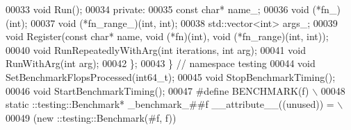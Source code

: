 \begin{DoxyCode}
00033   \textcolor{keywordtype}{void} Run();
00034  \textcolor{keyword}{private}:
00035   \textcolor{keyword}{const} \textcolor{keywordtype}{char}* name\_;
00036   void (*fn\_)(int);
00037   void (*fn\_range\_)(int, int);
00038   std::vector<int> args\_;
00039   \textcolor{keywordtype}{void} Register(\textcolor{keyword}{const} \textcolor{keywordtype}{char}* name, \textcolor{keywordtype}{void} (*fn)(\textcolor{keywordtype}{int}), \textcolor{keywordtype}{void} (*fn\_range)(\textcolor{keywordtype}{int}, \textcolor{keywordtype}{int}));
00040   \textcolor{keywordtype}{void} RunRepeatedlyWithArg(\textcolor{keywordtype}{int} iterations, \textcolor{keywordtype}{int} arg);
00041   \textcolor{keywordtype}{void} RunWithArg(\textcolor{keywordtype}{int} arg);
00042 \};
00043 \}  \textcolor{comment}{// namespace testing}
00044 \textcolor{keywordtype}{void} SetBenchmarkFlopsProcessed(int64\_t);
00045 \textcolor{keywordtype}{void} StopBenchmarkTiming();
00046 \textcolor{keywordtype}{void} StartBenchmarkTiming();
00047 \textcolor{preprocessor}{#define BENCHMARK(f) \(\backslash\)}
00048 \textcolor{preprocessor}{    static ::testing::Benchmark* \_benchmark\_##f \_\_attribute\_\_((unused)) = \(\backslash\)}
00049 \textcolor{preprocessor}{        (new ::testing::Benchmark(#f, f))}
\end{DoxyCode}
